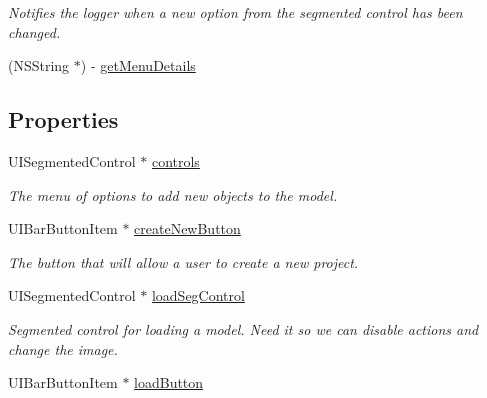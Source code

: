 \begin{DoxyCompactItemize}
\begin{DoxyCompactList}\small\item\em Notifies the logger when a new option from the segmented control has been changed. \end{DoxyCompactList}\item 
(N\-S\-String $\ast$) -\/ \hyperlink{interface_model_section_view_controller_a165de32a7bdbc801f76d3a61012d0679}{get\-Menu\-Details}
\end{DoxyCompactItemize}
\subsection*{Properties}
\begin{DoxyCompactItemize}
\item 
\hypertarget{interface_model_section_view_controller_a1160a302c7d1456b2232508e66bf74f3}{U\-I\-Segmented\-Control $\ast$ \hyperlink{interface_model_section_view_controller_a1160a302c7d1456b2232508e66bf74f3}{controls}}\label{interface_model_section_view_controller_a1160a302c7d1456b2232508e66bf74f3}

\begin{DoxyCompactList}\small\item\em The menu of options to add new objects to the model. \end{DoxyCompactList}\item 
\hypertarget{interface_model_section_view_controller_a6177c3f5ef7ae97e8a88fb845c4d5fd5}{U\-I\-Bar\-Button\-Item $\ast$ \hyperlink{interface_model_section_view_controller_a6177c3f5ef7ae97e8a88fb845c4d5fd5}{create\-New\-Button}}\label{interface_model_section_view_controller_a6177c3f5ef7ae97e8a88fb845c4d5fd5}

\begin{DoxyCompactList}\small\item\em The button that will allow a user to create a new project. \end{DoxyCompactList}\item 
\hypertarget{interface_model_section_view_controller_a770f2666d890b557d2e94ba5e1c2cbbf}{U\-I\-Segmented\-Control $\ast$ \hyperlink{interface_model_section_view_controller_a770f2666d890b557d2e94ba5e1c2cbbf}{load\-Seg\-Control}}\label{interface_model_section_view_controller_a770f2666d890b557d2e94ba5e1c2cbbf}

\begin{DoxyCompactList}\small\item\em Segmented control for loading a model. Need it so we can disable actions and change the image. \end{DoxyCompactList}\item 
\hypertarget{interface_model_section_view_controller_a4f48727f24dc50cb5241226fe2e5300b}{U\-I\-Bar\-Button\-Item $\ast$ \hyperlink{interface_model_section_view_controller_a4f48727f24dc50cb5241226fe2e5300b}{load\-Button}}\label{interface_model_section_view_controller_a4f48727f24dc50cb5241226fe2e5300b}


\end{DoxyCompactItemize}
